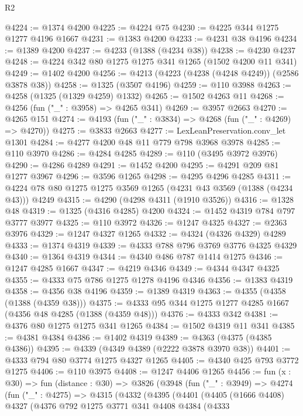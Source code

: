 \begin{lexlean}{R2}
\begin{coremodule}
@4224 := @1374 @4200
@4225 := @4224 @75
@4230 := @4225 @344 @1275 @1277 @4196 @1667
@4231 := @1383 @4200
@4233 := @4231 @38 @4196
@4234 := @1389 @4200
@4237 := @4233 (@1388 (@4234 @38))
@4238 := @4230 @4237
@4248 := @4224 @342 @80 @1275 @1275 @341 @1265 (@1502 @4200 @11 @341)
@4249 := @1402 @4200
@4256 := @4213 (@4223 (@4238 (@4248 @4249)) (@2586 @3878 @38))
@4258 := @1325 (@3507 @4196)
@4259 := @110 @3988
@4263 := @4258 (@1325 (@1329 @4259) @1332)
@4265 := @1502 @4263 @11
@4268 := @4256 (fun ("_" : @3958) => @4265 @341)
@4269 := @3957 @2663
@4270 := @4265 @151
@4274 := @4193 (fun ("_" : @3834) => @4268 (fun ("_" : @4269) => @4270))
@4275 := @3833 @2663
@4277 := LexLeanPreservation.conv_let @1301
@4284 := @4277 @4200 @48 @11 @779 @798 @3968 @3978
@4285 := @110 @3970
@4286 := @4284 @4285
@4289 := @110 (@3495 @3972 @3976)
@4290 := @4286 @4289
@4291 := @1452 @4200
@4295 := @4291 @209 @81 @1277 @3967
@4296 := @3596 @1265
@4298 := @4295 @4296 @4285
@4311 := @4224 @78 @80 @1275 @1275 @3569 @1265 (@4231 @43 @3569 (@1388 (@4234 @43))) @4249
@4315 := @4290 (@4298 @4311 (@1910 @3526))
@4316 := @1328 @48
@4319 := @1325 (@4316 @4285) @4200
@4324 := @1452 @4319 @784 @797 @3777 @3977
@4325 := @110 @3972
@4326 := @1247 @4325
@4327 := @2363 @3976
@4329 := @1247 @4327 @1265
@4332 := @4324 (@4326 @4329) @4289
@4333 := @1374 @4319
@4339 := @4333 @788 @796 @3769 @3776 @4325 @4329
@4340 := @1364 @4319
@4344 := @4340 @486 @787 @1414 @1275
@4346 := @1247 @4285 @1667
@4347 := @4219 @4346
@4349 := @4344 @4347 @4325
@4355 := @4333 @75 @786 @1275 @1278 @4196 @4346
@4356 := @1383 @4319
@4358 := @4356 @38 @4196
@4359 := @1389 @4319
@4363 := @4355 (@4358 (@1388 (@4359 @38)))
@4375 := @4333 @95 @344 @1275 @1277 @4285 @1667 (@4356 @48 @4285 (@1388 (@4359 @48)))
@4376 := @4333 @342
@4381 := @4376 @80 @1275 @1275 @341 @1265
@4384 := @1502 @4319 @11 @341
@4385 := @4381 @4384
@4386 := @1402 @4319
@4389 := @4363 (@4375 (@4385 @4386))
@4395 := @4339 (@4349 @4389 (@2222 @3878 @3970 @38))
@4401 := @4333 @794 @80 @3774 @1275 @4327 @1265
@4405 := @4340 @425 @793 @3772 @1275
@4406 := @110 @3975
@4408 := @1247 @4406 @1265
@4456 := fun (x : @30) =>
  fun (distance : @30) =>
  @3826
    (@3948
      (fun ("_" : @3949) =>
      @4274
        (fun ("_" : @4275) =>
        @4315
          (@4332
            (@4395
              (@4401
                (@4405
                  (@1666 @4408)
                  @4327
                  (@4376
                    @792
                    @1275
                    @3771
                    @341
                    @4408
                    @4384
                    (@4333

\end{coremodule}
\end{lexlean}
